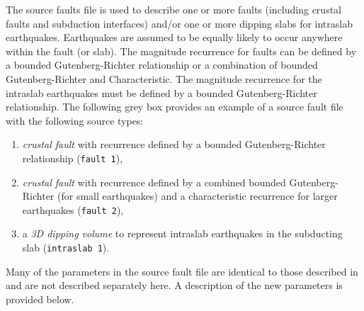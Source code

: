 The source faults file is used to describe one or more faults
(including crustal faults and subduction interfaces) and/or one or
more dipping slabs for intraslab earthquakes. Earthquakes are
assumed to be equally likely to occur anywhere within the fault (or
slab). The magnitude recurrence for faults can be defined by a
bounded Gutenberg-Richter relationship or a combination of bounded
Gutenberg-Richter and Characteristic. The magnitude recurrence for the
intraslab earthquakes must be defined by a bounded Gutenberg-Richter
relationship. The following grey box provides an example of a source
fault file with the following source types:
\begin{enumerate}
\item \textit{crustal fault} with recurrence defined by a bounded Gutenberg-Richter
relationship (\texttt{fault 1}),
\item \textit{crustal fault} with recurrence defined by a combined bounded Gutenberg-Richter
(for small earthquakes) and a characteristic recurrence for larger
earthquakes (\texttt{fault 2}),
\item a \textit{3D dipping volume} to represent intraslab earthquakes in the
subducting slab (\texttt{intraslab 1}).
\end{enumerate}
Many of the parameters in the source fault file are identical to
those described in  and are not described
separately here. A description of the new parameters is provided
below.

%


